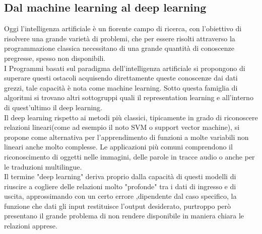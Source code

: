 \documentclass[10pt,a4paper]{article}
\begin{document}
\subsection{Dal machine learning al deep learning}
Oggi l'intelligenza artificiale è un fiorente campo di ricerca, con l'obiettivo di risolvere una grande varietà di problemi, che per essere risolti attraverso la programmazione classica necessitano di una grande quantità di conoscenze pregresse, spesso non disponibili.\\
I Programmi basati sul paradigma dell'intelligenza artificiale si propongono di superare questi ostacoli acquisendo direttamente queste conoscenze dai dati grezzi, tale capacità è nota come machine learning.
Sotto questa famiglia di algoritmi si trovano altri sottogruppi quali il representation learning e all'interno di quest'ultimo il deep learning.\\ 
Il deep learning rispetto ai metodi più classici, tipicamente in grado di riconoscere relazioni lineari(come ad esempio il noto SVM o support vector machine), si propone come alternativa per l'apprendimento di funzioni a molte variabili non lineari anche molto complesse.
Le applicazioni più comuni comprendono il riconoscimento di oggetti nelle immagini, delle parole in tracce audio o anche per le traduzioni multilingue. \\
Il termine "deep learning" deriva proprio dalla capacità di questi modelli di riuscire a cogliere delle relazioni molto "profonde" tra i dati di ingresso e di uscita, approssimando con un certo errore ,dipendente dal caso specifico, la funzione che dati gli input restituisce l'output desiderato, purtroppo però presentano il grande problema di non rendere disponibile in maniera chiara le relazioni apprese.
   
\end{document}
